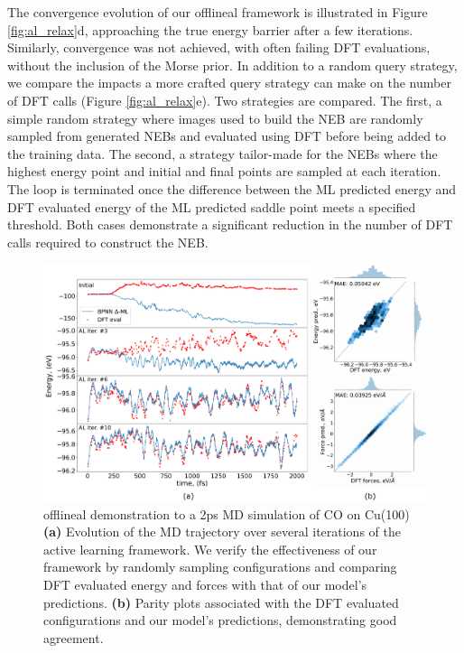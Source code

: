 \documentclass[%
 reprint,
 amsmath,amssymb,
 aps,
]{revtex4-2}
\begin{document}
The convergence evolution of our \gls{offlineal} framework is illustrated in Figure \ref{fig:al_relax}d, approaching the true energy barrier after a few iterations. Similarly, convergence was not achieved, with often failing DFT evaluations, without the inclusion of the Morse prior. In addition to a random query strategy, we compare the impacts a more crafted query strategy can make on the number of DFT calls (Figure \ref{fig:al_relax}e). Two strategies are compared. The first, a simple random strategy where images used to build the NEB are randomly sampled from generated NEBs and evaluated using DFT before being added to the training data. The second, a strategy tailor-made for the NEBs where the highest energy point and initial and final points are sampled at each iteration. The loop is terminated once the difference between the ML predicted energy and DFT evaluated energy of the ML predicted saddle point meets a specified threshold. Both cases demonstrate a significant reduction in the number of DFT calls required to construct the NEB. 

\begin{figure}
    \centering
    \includegraphics[width=\textwidth]{figures/figure_4.png}
    \caption{ \gls{offlineal} demonstration to a 2ps MD simulation of CO on Cu(100) \textbf{(a)} Evolution of the MD trajectory over several iterations of the active learning framework. We verify the effectiveness of our framework by randomly sampling configurations and comparing DFT evaluated energy and forces with that of our model's predictions. \textbf{(b)} Parity plots associated with the DFT evaluated configurations and our model's predictions, demonstrating good agreement.
    }
    \label{fig:al_md}
\end{figure}
\end{document}

